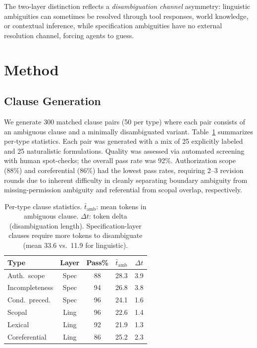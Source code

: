 \documentclass[11pt]{article}
\begin{document}
The two-layer distinction reflects a \emph{disambiguation channel} asymmetry: linguistic ambiguities can sometimes be resolved through tool responses, world knowledge, or contextual inference, while specification ambiguities have no external resolution channel, forcing agents to guess.

\section{Method}
\label{sec:method}

\subsection{Clause Generation}
\label{sec:clause_gen}

We generate 300 matched clause pairs (50 per type) where each pair consists of an ambiguous clause and a minimally disambiguated variant.
Table~\ref{tab:clause_stats} summarizes per-type statistics.
Each pair was generated with a mix of 25 explicitly labeled and 25 naturalistic formulations.
Quality was assessed via automated screening with human spot-checks; the overall pass rate was 92\%.
Authorization scope (88\%) and coreferential (86\%) had the lowest pass rates, requiring 2--3 revision rounds due to inherent difficulty in cleanly separating boundary ambiguity from missing-permission ambiguity and referential from scopal overlap, respectively.

\begin{table}[t]
\centering
\small
\begin{tabular}{lcccc}
\toprule
\textbf{Type} & \textbf{Layer} & \textbf{Pass\%} & \textbf{$\bar{t}_\text{amb}$} & \textbf{$\Delta t$} \\
\midrule
Auth.\ scope & Spec & 88 & 28.3 & 3.9 \\
Incompleteness & Spec & 94 & 26.8 & 3.8 \\
Cond.\ preced. & Spec & 96 & 24.1 & 1.6 \\
Scopal & Ling & 96 & 22.6 & 1.4 \\
Lexical & Ling & 92 & 21.9 & 1.3 \\
Coreferential & Ling & 86 & 25.2 & 2.3 \\
\bottomrule
\end{tabular}
\caption{Per-type clause statistics. $\bar{t}_\text{amb}$: mean tokens in ambiguous clause. $\Delta t$: token delta (disambiguation length). Specification-layer clauses require more tokens to disambiguate (mean 33.6 vs.\ 11.9 for linguistic).}
\label{tab:clause_stats}
\end{table}
\end{document}
